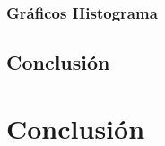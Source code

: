 \documentclass[final,narroweqnarray,inline]{ieee}
\begin{document}
  \subsubsection*{Gráficos Histograma}

  \subsection{Conclusión}

\newpage
\section{Conclusión}






\end{document}
